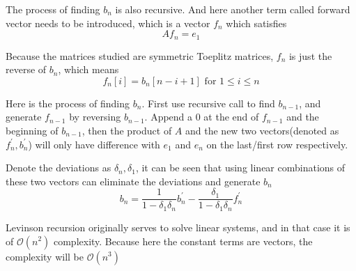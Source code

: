 \documentclass{article}
\begin{document}
The process of finding $b_n$ is also recursive. And here another term called forward vector needs to be introduced, which is a vector $f_n$ which satisfies $$Af_n=e_1$$

Because the matrices studied are symmetric Toeplitz matrices, $f_n$ is just the reverse of $b_n$, which means $$f_n[i]=b_n[n-i+1] \text{ for } 1\leq i \leq n$$

Here is the process of finding $b_n$. First use recursive call to find $b_{n-1}$, and generate $f_{n-1}$ by reversing $b_{n-1}$. Append a 0 at the end of $f_{n-1}$ and the beginning of $b_{n-1}$, then the product of $A$ and the new two vectors(denoted as $f_{n}^{'},b_{n}^{'}$) will only have difference with $e_1$ and $e_n$ on the last/first row respectively. 

Denote the deviations as $\delta_n,\delta_1$, it can be seen that using linear combinations of these two vectors can eliminate the deviations and generate $b_n$ $$b_n = \frac{1}{1-\delta_1\delta_n}b_{n}^{'}-\frac{\delta_1}{1-\delta_1\delta_n}f_{n}^{'}$$

Levinson recursion originally serves to solve linear systems, and in that case it is of $\mathcal{O}(n^2)$ complexity. Because here the constant terms are vectors, the complexity will be $\mathcal{O}(n^3)$

\begin{Algorithm}[Cholesky Algorithm\label{problem49a}][H]
	\BlankLine


\end{Algorithm}
\end{document}
